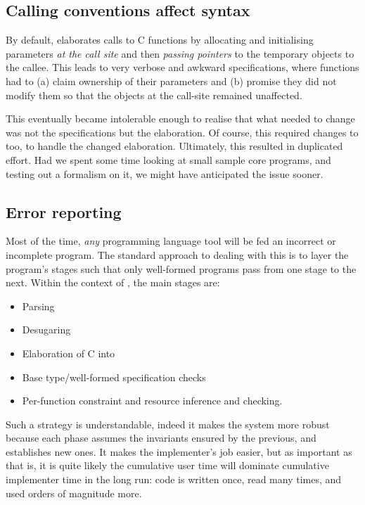 \subsection{Calling conventions affect syntax}

By default,  elaborates calls to C functions by allocating and
initialising parameters \emph{at the call site} and then \emph{passing
pointers} to the temporary objects to the callee. This leads to very verbose
and awkward specifications, where functions had to (a) claim ownership of their
parameters and (b) promise they did not modify them so that the objects at the
call-site remained unaffected.

This eventually became intolerable enough to realise that what needed to change
was not the specifications but the
elaboration. Of course, this required changes to 
too, to handle the changed elaboration. Ultimately, this resulted in
duplicated effort. Had we spent some time looking at small sample core
programs, and testing out a formalism on it, we might have anticipated the
issue sooner.


\subsection{Error reporting}

Most of the time, \emph{any} programming language tool will be fed an incorrect
or incomplete program. The standard approach to dealing with this is to layer
the program's stages such that only well-formed programs pass from one stage to
the next. Within the context of , the main stages are:
\begin{itemize}
    \item Parsing
    \item Desugaring
    \item Elaboration of C into 
    \item Base type/well-formed specification checks
    \item Per-function constraint and resource inference and checking.
\end{itemize}

Such a strategy is understandable, indeed it makes the system more robust
because each phase assumes the invariants ensured by the previous, and
establishes new ones. It makes the implementer's job easier, but as important
as that is, it is quite likely the cumulative user time will dominate
cumulative implementer time in the long run: code is written once, read many
times, and used orders of magnitude more.


